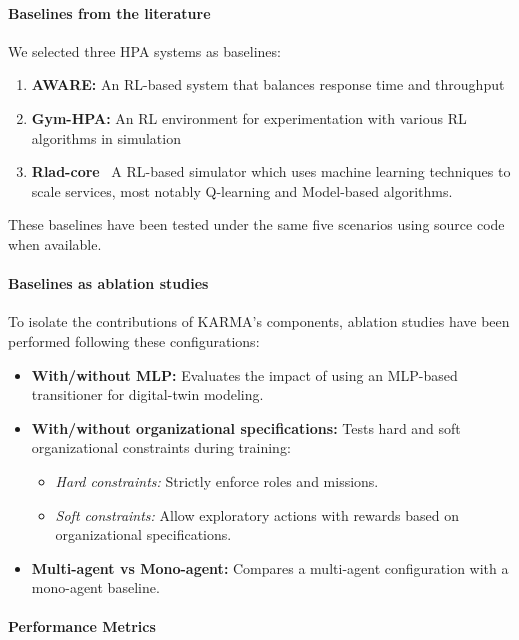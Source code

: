 \paragraph{\textbf{Baselines from the literature}}
%
\noindent We selected three HPA systems as baselines:
\begin{enumerate}[label=\textbf{\arabic*)}, itemjoin={;\quad }]
    \item \textbf{AWARE:} An RL-based system that balances response time and throughput~\cite{aware2023}
    \item \textbf{Gym-HPA:} An RL environment for experimentation with various RL algorithms in simulation~\cite{gymhpa2022}
    \item \textbf{Rlad-core}~\cite{Rossi2019} A RL-based simulator which uses machine learning techniques to scale services, most notably Q-learning and Model-based algorithms.
\end{enumerate}

These baselines have been tested under the same five scenarios using source code when available.

\paragraph{\textbf{Baselines as ablation studies}}

\noindent To isolate the contributions of KARMA's components, ablation studies have been performed following these configurations:
%
\begin{itemize}
    \item \textbf{With/without MLP:} Evaluates the impact of using an MLP-based transitioner for digital-twin modeling.
    \item \textbf{With/without organizational specifications:} Tests hard and soft organizational constraints during training:
        \begin{itemize}
            \item \textit{Hard constraints:} Strictly enforce roles and missions.
            \item \textit{Soft constraints:} Allow exploratory actions with rewards based on organizational specifications.
        \end{itemize}
    \item \textbf{Multi-agent vs Mono-agent:} Compares a multi-agent configuration with a mono-agent baseline.
\end{itemize}

\paragraph{\textbf{Performance Metrics}}

